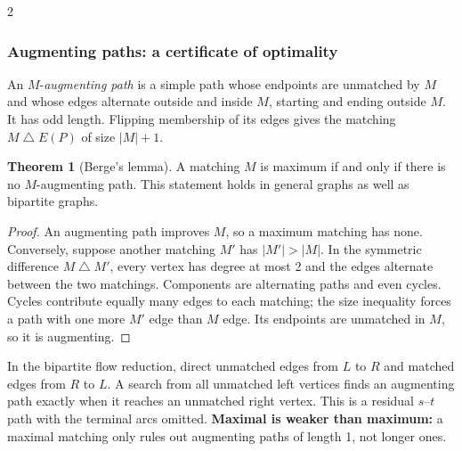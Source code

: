 \documentclass[8pt]{extarticle}
\theoremstyle{definition}
\newtheorem{theorem}[definition]{Theorem}
\begin{document}
\begin{multicols*}{2}
\subsubsection*{Augmenting paths: a certificate of optimality}
An $M$-\emph{augmenting path} is a simple path whose endpoints are unmatched
by $M$ and whose edges alternate outside and inside $M$, starting and ending
outside $M$. It has odd length. Flipping membership of its edges gives the
matching $M\mathbin{\triangle}E(P)$ of size $|M|+1$.
\begin{theorem}[Berge's lemma]\label{nf:berge}
A matching $M$ is maximum if and only if there is no $M$-augmenting path.
This statement holds in general graphs as well as bipartite graphs.
\end{theorem}
\begin{proof}
An augmenting path improves $M$, so a maximum matching has none.
Conversely, suppose another matching $M'$ has $|M'|>|M|$. In the symmetric
difference $M\mathbin{\triangle}M'$, every vertex has degree at most 2 and
the edges alternate between the two matchings. Components are alternating
paths and even cycles. Cycles contribute equally many edges to each
matching; the size inequality forces a path with one more $M'$ edge than
$M$ edge. Its endpoints are unmatched in $M$, so it is augmenting.
\end{proof}
In the bipartite flow reduction, direct unmatched edges from $L$ to $R$ and
matched edges from $R$ to $L$. A search from all unmatched left vertices
finds an augmenting path exactly when it reaches an unmatched right vertex.
This is a residual $s$--$t$ path with the terminal arcs omitted.
\textbf{Maximal is weaker than maximum:} a maximal matching only rules out
augmenting paths of length 1, not longer ones.


\end{multicols*}
\end{document}
